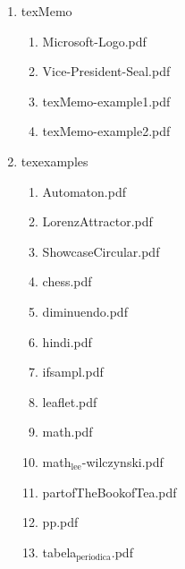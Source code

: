 \documentclass[11pt]{article}
\begin{document}
\begin{enumerate}
\item texMemo
\label{sec-1-1-1-1-46-9-19}
\begin{enumerate}
\item Microsoft-Logo.pdf
\label{sec-1-1-1-1-46-9-19-1}

\item Vice-President-Seal.pdf
\label{sec-1-1-1-1-46-9-19-2}

\item texMemo-example1.pdf
\label{sec-1-1-1-1-46-9-19-3}

\item texMemo-example2.pdf
\label{sec-1-1-1-1-46-9-19-4}
\end{enumerate}

\item texexamples
\label{sec-1-1-1-1-46-9-20}
\begin{enumerate}
\item Automaton.pdf
\label{sec-1-1-1-1-46-9-20-1}

\item LorenzAttractor.pdf
\label{sec-1-1-1-1-46-9-20-2}

\item ShowcaseCircular.pdf
\label{sec-1-1-1-1-46-9-20-3}

\item chess.pdf
\label{sec-1-1-1-1-46-9-20-4}

\item diminuendo.pdf
\label{sec-1-1-1-1-46-9-20-5}

\item hindi.pdf
\label{sec-1-1-1-1-46-9-20-6}

\item ifsampl.pdf
\label{sec-1-1-1-1-46-9-20-7}

\item leaflet.pdf
\label{sec-1-1-1-1-46-9-20-8}

\item math.pdf
\label{sec-1-1-1-1-46-9-20-9}

\item math$_{\text{lee}}$-wilczynski.pdf
\label{sec-1-1-1-1-46-9-20-10}

\item partofTheBookofTea.pdf
\label{sec-1-1-1-1-46-9-20-11}

\item pp.pdf
\label{sec-1-1-1-1-46-9-20-12}

\item tabela$_{\text{periodica}}$.pdf
\label{sec-1-1-1-1-46-9-20-13}


\end{enumerate}
\end{enumerate}
\end{document}
